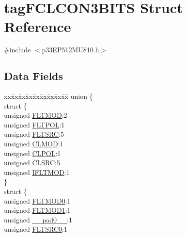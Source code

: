 \hypertarget{structtag_f_c_l_c_o_n3_b_i_t_s}{}\section{tag\+F\+C\+L\+C\+O\+N3\+B\+I\+TS Struct Reference}
\label{structtag_f_c_l_c_o_n3_b_i_t_s}


{\ttfamily \#include $<$p33\+E\+P512\+M\+U810.\+h$>$}

\subsection*{Data Fields}
\begin{DoxyCompactItemize}
\item 
\begin{tabbing}
xx\=xx\=xx\=xx\=xx\=xx\=xx\=xx\=xx\=\kill
union \{\\
\>struct \{\\
\>\>unsigned \hyperlink{structtag_f_c_l_c_o_n3_b_i_t_s_af8b7a5d667b31f1b0185c35ff963fc67}{FLTMOD}:2\\
\>\>unsigned \hyperlink{structtag_f_c_l_c_o_n3_b_i_t_s_acc9b95c2c3d735179abf0bb2304d00aa}{FLTPOL}:1\\
\>\>unsigned \hyperlink{structtag_f_c_l_c_o_n3_b_i_t_s_a5a279b9076b9774eeddf447ae606182a}{FLTSRC}:5\\
\>\>unsigned \hyperlink{structtag_f_c_l_c_o_n3_b_i_t_s_a9e490f0d4e5c9492ed27b0835fd4baa1}{CLMOD}:1\\
\>\>unsigned \hyperlink{structtag_f_c_l_c_o_n3_b_i_t_s_aa4163df728ce542fa3662a31fed0dab0}{CLPOL}:1\\
\>\>unsigned \hyperlink{structtag_f_c_l_c_o_n3_b_i_t_s_a55ab508cbc7a5023f1962f743a92a56b}{CLSRC}:5\\
\>\>unsigned \hyperlink{structtag_f_c_l_c_o_n3_b_i_t_s_a4573eed251d96a98a6b5ba1c7cc30451}{IFLTMOD}:1\\
\>\} \\
\>struct \{\\
\>\>unsigned \hyperlink{structtag_f_c_l_c_o_n3_b_i_t_s_acd6a08a1920b6cc12c170cbd6a61247d}{FLTMOD0}:1\\
\>\>unsigned \hyperlink{structtag_f_c_l_c_o_n3_b_i_t_s_accd970bed6a20d6ed7d5a8bb0a9329a3}{FLTMOD1}:1\\
\>\>unsigned \hyperlink{structtag_f_c_l_c_o_n3_b_i_t_s_adf71f3d8410c1f1dbbc96680a92c49af}{\_\_pad0\_\_}:1\\
\>\>unsigned \hyperlink{structtag_f_c_l_c_o_n3_b_i_t_s_ab130e70dc1cfc857cc586e187458c5ea}{FLTSRC0}:1\\

\end{tabbing}
\end{DoxyCompactItemize}
